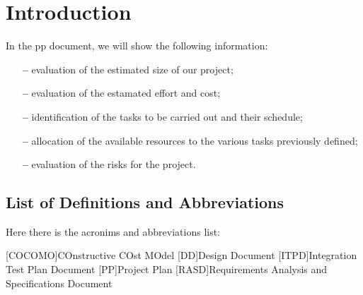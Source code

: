 \section{Introduction} \label{sec:intro}

In the \acl{pp} document, we will show the following information:

\begin{itemize}

\item[\textbf{--}]evaluation of the estimated size of our project;

\item[\textbf{--}]evaluation of the estamated effort and cost;

\item[\textbf{--}]identification of the tasks to be carried out and their schedule;

\item[\textbf{--}]allocation of the available resources to the various tasks previously defined;

\item[\textbf{--}]evaluation of the risks for the project.

\end{itemize}

\subsection{List of Definitions and Abbreviations}
Here there is the acronims and abbreviations list:

\begin{acronym}[COCOMO] %

[COCOMO]{COnstructive COst MOdel}
[DD]{Design Document}
[ITPD]{Integration Test Plan Document}
[PP]{Project Plan}
[RASD]{Requirements Analysis and Specifications Document}

\end{acronym}

